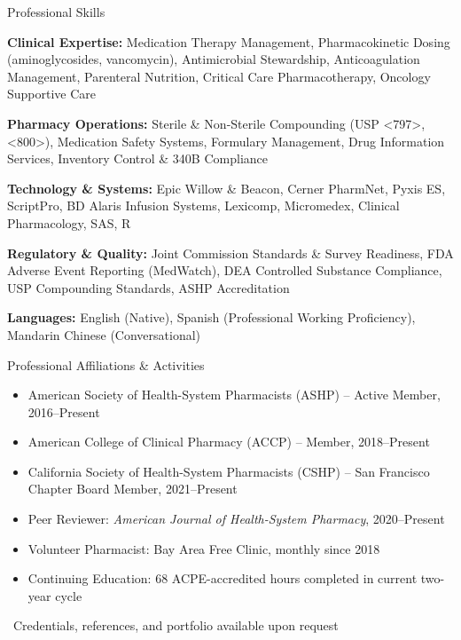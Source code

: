 \documentclass[11pt,letterpaper]{article}
\newcommand{\skillcategory}[2]{%
  \textbf{\color{primaryblue}#1:} #2\par\vspace{4pt}%
}
\begin{document}
\begin{sectionbox}
  Professional Skills
\end{sectionbox}

\skillcategory{Clinical Expertise}
{Medication Therapy Management, Pharmacokinetic Dosing (aminoglycosides, vancomycin), Antimicrobial Stewardship, Anticoagulation Management, Parenteral Nutrition, Critical Care Pharmacotherapy, Oncology Supportive Care}

\skillcategory{Pharmacy Operations}
{Sterile \& Non-Sterile Compounding (USP \textless{}797\textgreater{}, \textless{}800\textgreater{}), Medication Safety Systems, Formulary Management, Drug Information Services, Inventory Control \& 340B Compliance}

\skillcategory{Technology \& Systems}
{Epic Willow \& Beacon, Cerner PharmNet, Pyxis ES, ScriptPro, BD Alaris Infusion Systems, Lexicomp, Micromedex, Clinical Pharmacology, SAS, R}

\skillcategory{Regulatory \& Quality}
{Joint Commission Standards \& Survey Readiness, FDA Adverse Event Reporting (MedWatch), DEA Controlled Substance Compliance, USP Compounding Standards, ASHP Accreditation}

\skillcategory{Languages}
{English (Native), Spanish (Professional Working Proficiency), Mandarin Chinese (Conversational)}

\begin{sectionbox}
  Professional Affiliations \& Activities
\end{sectionbox}

\begin{itemize}
  \item American Society of Health-System Pharmacists (ASHP) -- Active Member, 2016--Present
  \item American College of Clinical Pharmacy (ACCP) -- Member, 2018--Present
  \item California Society of Health-System Pharmacists (CSHP) -- San Francisco Chapter Board Member, 2021--Present
  \item Peer Reviewer: \textit{American Journal of Health-System Pharmacy}, 2020--Present
  \item Volunteer Pharmacist: Bay Area Free Clinic, monthly since 2018
  \item Continuing Education: 68 ACPE-accredited hours completed in current two-year cycle
\end{itemize}

\begin{center}
  \vspace{6pt}
  {\small\color{headergray}\faFile\ Credentials, references, and portfolio available upon request}
\end{center}
\end{document}
